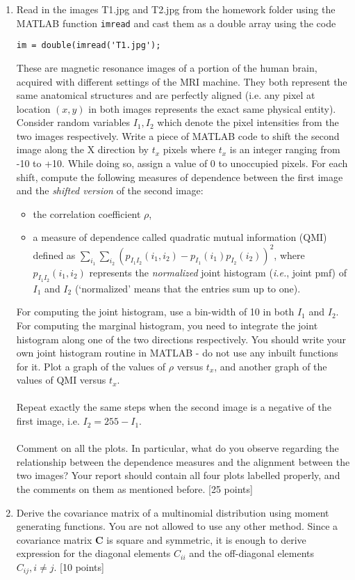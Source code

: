 \documentclass[11pt]{article}
\begin{document}
\begin{enumerate}
\item Read in the images T1.jpg and T2.jpg from the homework folder using the MATLAB function \texttt{imread} and cast them as a double array using the code \begin{verbatim}im = double(imread('T1.jpg');\end{verbatim} These are magnetic resonance images of a portion of the human brain, acquired with different settings of the MRI machine. They both represent the same anatomical structures and are perfectly aligned (i.e. any pixel at location $(x,y)$ in both images represents the exact same physical entity). Consider random variables $I_1, I_2$ which denote the pixel intensities from the two images respectively. Write a piece of MATLAB code to shift the second image along the X direction by $t_x$ pixels where $t_x$ is an integer ranging from -10 to +10. While doing so, assign a value of 0 to unoccupied pixels. For each shift, compute the following measures of dependence between the first image and the \emph{shifted version} of the second image:
\begin{itemize}
\item the correlation coefficient $\rho$, 
\item a measure of dependence called quadratic mutual information (QMI) defined as $\sum_{i_1}\sum_{i_2} (p_{I_1 I_2}(i_1,i_2)-p_{I_1}(i_1)p_{I_2}(i_2))^2$, where $p_{I_1 I_2}(i_1,i_2)$ represents the \emph{normalized} joint histogram (\textit{i.e.}, joint pmf) of $I_1$ and $I_2$ (`normalized' means that the entries sum up to one). 
\end{itemize}
For computing the joint histogram, use a bin-width of 10 in both $I_1$ and $I_2$. For computing the marginal histogram, you need to integrate the joint histogram along one of the two directions respectively. You should write your own joint histogram routine in MATLAB - do not use any inbuilt functions for it. Plot a graph of the values of $\rho$ versus $t_x$, and another graph of the values of QMI versus $t_x$.\\\\ Repeat exactly the same steps when the second image is a negative of the first image, i.e. $I_2 = 255 - I_1$. \\\\
Comment on all the plots. In particular, what do you observe regarding the relationship between the dependence measures and the alignment between the two images? Your report should contain all four plots labelled properly, and the comments on them as mentioned before. \textsf{[25 points]}

\item Derive the covariance matrix of a multinomial distribution using moment generating functions. You are not allowed to use any other method. Since a covariance matrix $\boldsymbol{C}$ is square and symmetric, it is enough to derive expression for the diagonal elements $C_{ii}$ and the off-diagonal elements $C_{ij}, i \neq j$. \textsf{[10 points]}

\end{enumerate}
\end{document}

